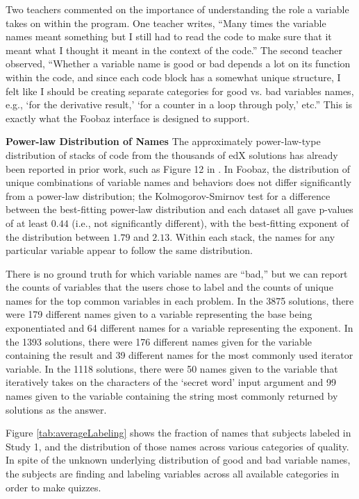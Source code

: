 Two teachers commented on the importance of understanding the role a variable takes on within the program. One teacher writes, ``Many times the variable names meant something but I still had to read the code to make sure that it meant what I thought it meant in the context of the code.'' The second teacher observed, ``Whether a variable name is good or bad depends a lot on its function within the code, and since each code block has a somewhat unique structure, I felt like I should be creating separate categories for good vs. bad variables names, e.g., `for the derivative result,' `for a counter in a loop through poly,' etc.'' This is exactly what the Foobaz interface is designed to support. 

\textbf{Power-law Distribution of Names}
The approximately power-law-type distribution of stacks of code from the thousands of edX solutions has already been reported in prior work, such as Figure 12 in \cite{overcode}. In Foobaz, the distribution of unique combinations of variable names and behaviors does not differ
significantly from a power-law distribution; the Kolmogorov-Smirnov test for a difference between the best-fitting power-law distribution and each dataset all gave p-values of at least $0.44$ (i.e., not significantly different), with the best-fitting exponent of the distribution between
$1.79$ and $2.13$. Within each stack, the names for any particular variable appear to follow the same distribution.

There is no ground truth for which variable names are ``bad,'' but we can report the counts of variables that the users chose to label and the counts of unique names for the top common variables in each problem. In the 3875  solutions, there were 179 different names given to a variable representing the base being exponentiated and 64 different names for a variable representing the exponent. In the 1393  solutions, there were 176 different names given for the variable containing the result and 39 different names for the most commonly used iterator variable. In the 1118  solutions, there were 50 names given to the variable that iteratively takes on the characters of the `secret word' input argument and 99 names given to the variable containing the string most commonly returned by solutions as the answer. 

Figure \ref{tab:averageLabeling} shows the fraction of names that subjects labeled in Study 1, and the distribution of those names across various categories of quality. In spite of the unknown underlying distribution of good and bad variable names, the subjects are finding and labeling variables across all available categories in order to make quizzes.
 
